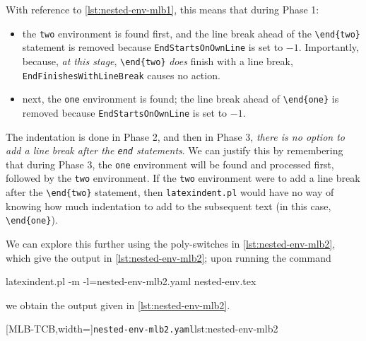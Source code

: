 	With reference to \cref{lst:nested-env-mlb1}, this means that during Phase 1:
	\begin{itemize}
		\item the \texttt{two} environment is found first, and
		      the line break ahead of the \lstinline!\end{two}! statement is removed because \texttt{EndStartsOnOwnLine} is set to $-1$. Importantly,
		      because, \emph{at this stage}, \lstinline!\end{two}! \emph{does} finish with a line break, \texttt{EndFinishesWithLineBreak} causes
		      no action.
		\item next, the \texttt{one} environment is found; the line break ahead of \lstinline!\end{one}! is removed because \texttt{EndStartsOnOwnLine}
		      is set to $-1$.
	\end{itemize}
	The indentation is done in Phase 2, and then in Phase 3, \emph{there is no option to add a line break after the \lstinline!end! statements}.
	We can justify this by remembering that during Phase 3, the \texttt{one} environment will be found and processed first, followed
	by the \texttt{two} environment. If the \texttt{two} environment were to add a line break after the \lstinline!\end{two}! statement, then
	\texttt{latexindent.pl} would have no way of knowing how much indentation to add to the subsequent text (in this case, \lstinline!\end{one}!).

	We can explore this further using the poly-switches in \cref{lst:nested-env-mlb2}, which give the output in \cref{lst:nested-env-mlb2};
	upon running the command
	\begin{commandshell}
latexindent.pl -m -l=nested-env-mlb2.yaml nested-env.tex
        \end{commandshell}
	we obtain the output given in \cref{lst:nested-env-mlb2}.

	\begin{minipage}{.45\linewidth}
	\end{minipage}
	\hfill
	\begin{minipage}{.55\linewidth}
		[MLB-TCB,width=\linewidth]{\texttt{nested-env-mlb2.yaml}}{lst:nested-env-mlb2}
	\end{minipage}

